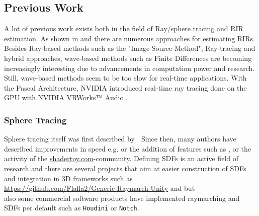 \documentclass[twoside,a4paper]{article}
\begin{document}
\subsection{Previous Work}
\label{ssec:prev}
A lot of previous work exists both in the field of Ray/sphere tracing and RIR estimation.
As shown in \cite{alpkocak_computing_2010} and \cite{brinkmann_round_2019} there are numerous approaches for estimating RIRs. Besides Ray-based methods such as the "Image Source Method", Ray-tracing and hybrid approaches, wave-based methods such as Finite Differences are becoming increasingly interesting due to advancements in computation power and research. Still, wave-based methods seem to be too slow for real-time applications. With the Pascal Architecture, NVIDIA introduced real-time ray tracing done on the GPU with NVIDIA VRWorks™ Audio \cite{noauthor_vrworks_nodate}.






\subsubsection*{Sphere Tracing}
Sphere tracing itself was first described by \cite{hart_sphere_1996}. Since then, many authors have described improvements in speed e.g. \cite{balint_accelerating_2018} or the addition of features such as \cite{quilez_inigo_nodate}, \cite{keinert_enhanced_2014} or the activity of the \href{www.shadertoy.com}{shadertoy.com}-community.
Defining SDFs is an active field of research and there are several projects that aim at easier construction of SDFs and integration in 3D frameworks such as \\
\href{https://github.com/Flafla2/Generic-Raymarch-Unity}{https://github.com/Flafla2/Generic-Raymarch-Unity} and \cite{lechner_hrtlacektdraymarchtoolkit_2020} but \\ 
also some commercial software products have implemented raymarching and SDFs per default such as \texttt{Houdini} or \texttt{Notch}.
\end{document}
